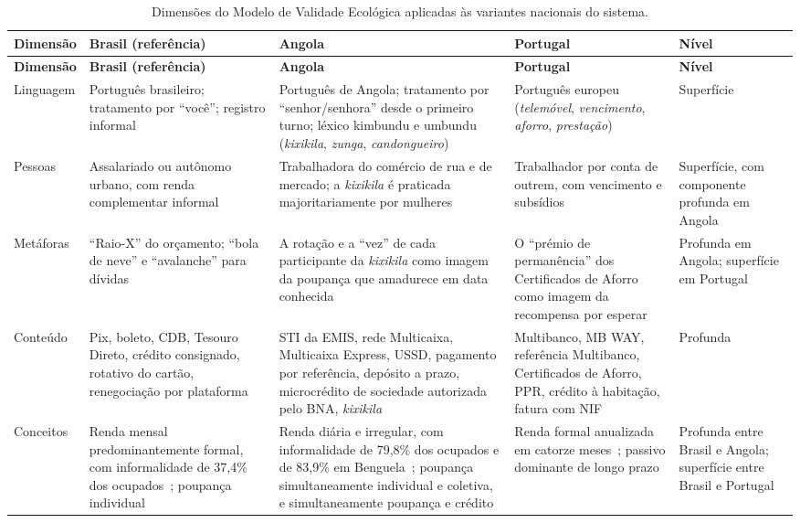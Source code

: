 {\footnotesize
\setlength{\tabcolsep}{2pt}
\begin{longtable}{>{\raggedright\arraybackslash}p{1.7cm}>{\raggedright\arraybackslash}p{2.9cm}>{\raggedright\arraybackslash}p{3.0cm}>{\raggedright\arraybackslash}p{2.9cm}>{\raggedright\arraybackslash}p{1.7cm}}
\caption{Dimensões do Modelo de Validade Ecológica aplicadas às variantes nacionais do sistema.}
\label{tab:variantes_evm} \\
\hline
\textbf{Dimensão} & \textbf{Brasil (referência)} & \textbf{Angola} & \textbf{Portugal} & \textbf{Nível} \\
\hline
\endfirsthead
\hline
\textbf{Dimensão} & \textbf{Brasil (referência)} & \textbf{Angola} & \textbf{Portugal} & \textbf{Nível} \\
\hline
\endhead
\hline
\endfoot
Linguagem & Português brasileiro; tratamento por ``você''; registro informal & Português de Angola; tratamento por ``senhor/senhora'' desde o primeiro turno; léxico kimbundu e umbundu (\textit{kixikila}, \textit{zunga}, \textit{candongueiro}) & Português europeu (\textit{telemóvel}, \textit{vencimento}, \textit{aforro}, \textit{prestação}) & Superfície \\
\hline
Pessoas & Assalariado ou autônomo urbano, com renda complementar informal & Trabalhadora do comércio de rua e de mercado; a \textit{kixikila} é praticada majoritariamente por mulheres~\cite{carlos2014kixikila} & Trabalhador por conta de outrem, com vencimento e subsídios & Superfície, com componente profunda em Angola \\
\hline
Metáforas & ``Raio-X'' do orçamento; ``bola de neve'' e ``avalanche'' para dívidas & A rotação e a ``vez'' de cada participante da \textit{kixikila} como imagem da poupança que amadurece em data conhecida & O ``prémio de permanência'' dos Certificados de Aforro como imagem da recompensa por esperar & Profunda em Angola; superfície em Portugal \\
\hline
Conteúdo & Pix, boleto, CDB, Tesouro Direto, crédito consignado, rotativo do cartão, renegociação por plataforma & STI da EMIS, rede Multicaixa, Multicaixa Express, USSD, pagamento por referência, depósito a prazo, microcrédito de sociedade autorizada pelo BNA, \textit{kixikila} & Multibanco, MB WAY, referência Multibanco, Certificados de Aforro, PPR, crédito à habitação, fatura com NIF & Profunda \\
\hline
Conceitos & Renda mensal predominantemente formal, com informalidade de 37,4\% dos ocupados~\cite{ibge2026pnad}; poupança individual & Renda diária e irregular, com informalidade de 79,8\% dos ocupados e de 83,9\% em Benguela~\cite{ineangola2024emprego}; poupança simultaneamente individual e coletiva, e simultaneamente poupança e crédito & Renda formal anualizada em catorze meses~\cite{ct2009}; passivo dominante de longo prazo & Profunda entre Brasil e Angola; superfície entre Brasil e Portugal \\

\end{longtable}}
